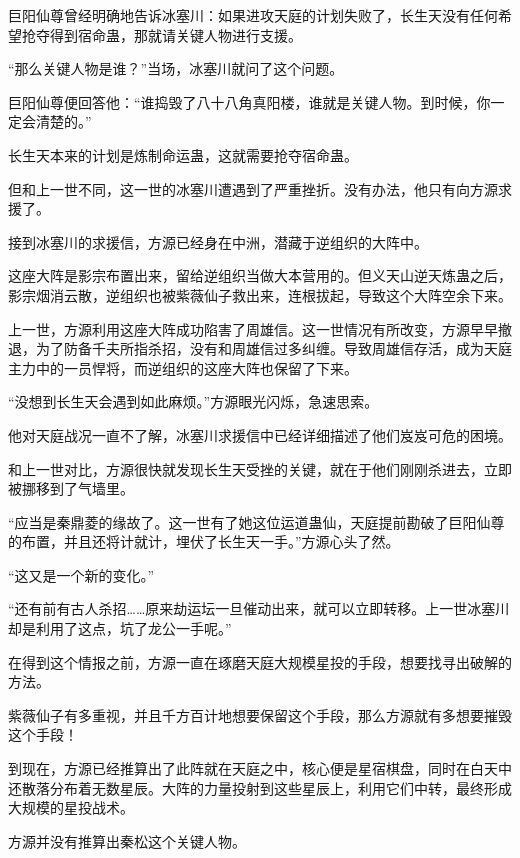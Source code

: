 
\begin{this_body}

巨阳仙尊曾经明确地告诉冰塞川：如果进攻天庭的计划失败了，长生天没有任何希望抢夺得到宿命蛊，那就请关键人物进行支援。

“那么关键人物是谁？”当场，冰塞川就问了这个问题。

巨阳仙尊便回答他：“谁捣毁了八十八角真阳楼，谁就是关键人物。到时候，你一定会清楚的。”

长生天本来的计划是炼制命运蛊，这就需要抢夺宿命蛊。

但和上一世不同，这一世的冰塞川遭遇到了严重挫折。没有办法，他只有向方源求援了。

接到冰塞川的求援信，方源已经身在中洲，潜藏于逆组织的大阵中。

这座大阵是影宗布置出来，留给逆组织当做大本营用的。但义天山逆天炼蛊之后，影宗烟消云散，逆组织也被紫薇仙子救出来，连根拔起，导致这个大阵空余下来。

上一世，方源利用这座大阵成功陷害了周雄信。这一世情况有所改变，方源早早撤退，为了防备千夫所指杀招，没有和周雄信过多纠缠。导致周雄信存活，成为天庭主力中的一员悍将，而逆组织的这座大阵也保留了下来。

“没想到长生天会遇到如此麻烦。”方源眼光闪烁，急速思索。

他对天庭战况一直不了解，冰塞川求援信中已经详细描述了他们岌岌可危的困境。

和上一世对比，方源很快就发现长生天受挫的关键，就在于他们刚刚杀进去，立即被挪移到了气墙里。

“应当是秦鼎菱的缘故了。这一世有了她这位运道蛊仙，天庭提前勘破了巨阳仙尊的布置，并且还将计就计，埋伏了长生天一手。”方源心头了然。

“这又是一个新的变化。”

“还有前有古人杀招……原来劫运坛一旦催动出来，就可以立即转移。上一世冰塞川却是利用了这点，坑了龙公一手呢。”

在得到这个情报之前，方源一直在琢磨天庭大规模星投的手段，想要找寻出破解的方法。

紫薇仙子有多重视，并且千方百计地想要保留这个手段，那么方源就有多想要摧毁这个手段！

到现在，方源已经推算出了此阵就在天庭之中，核心便是星宿棋盘，同时在白天中还散落分布着无数星辰。大阵的力量投射到这些星辰上，利用它们中转，最终形成大规模的星投战术。

方源并没有推算出秦松这个关键人物。


\end{this_body}
